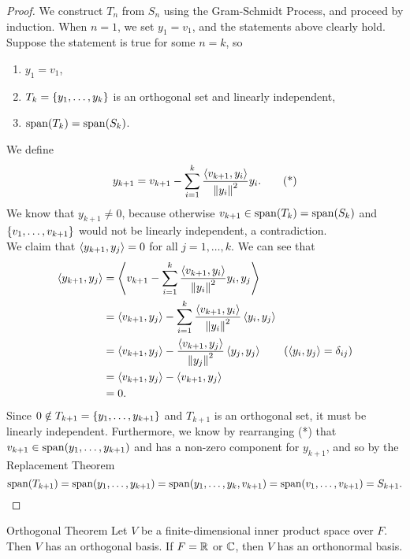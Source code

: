 \documentclass[class=article, crop=false]{standalone}
\begin{document}
  \begin{proof}
    We construct $T_n$ from $S_n$ using the Gram-Schmidt Process, and proceed by induction. When $n = 1$, we set $y_1 = v_1$, and the statements above clearly hold. Suppose the statement is true for some $n = k$, so 
    \begin{enumerate}[label=(\roman*)]
      \item $y_1 = v_1$,
      \item $T_k = \left\{y_1,\dotsc,y_k\right\}$ is an orthogonal set and linearly independent,
      \item $\operatorname{span}(T_k) = \operatorname{span}(S_k)$.
    \end{enumerate}
    We define
    \[
      y_{k+1} = v_{k+1} - \sum_{i=1}^{k}\frac{\left\langle v_{k+1},y_i \right\rangle}{\left\lVert y_i\right\rVert^2}y_i. \tag{*}
    \]
    We know that $y_{k+1}\neq 0$, because otherwise $v_{k+1}\in \operatorname{span}(T_k) = \operatorname{span}(S_k)$ and $\left\{v_1,\dotsc,v_{k+1}\right\}$ would not be linearly independent, a contradiction. \\[10pt]
    We claim that $\left\langle y_{k+1}, y_j \right\rangle = 0$ for all $j = 1,\dotsc,k$. We can see that
    \begin{align*}
      \tup{y_{k+1}, y_j} &= \tup{v_{k+1} - \sum_{i=1}^{k}\frac{\tup{v_{k+1},y_i}}{\norm{y_i}^2}y_i, y_j} \\
                         &= \tup{v_{k+1}, y_j} - \sum_{i=1}^{k}\frac{\tup{v_{k+1},y_i}}{\norm{y_i}^2}\tup{y_i,y_j} \\
                         &= \tup{v_{k+1}, y_j} - \frac{\tup{v_{k+1},y_j}}{\norm{y_j}^2}\tup{y_j, y_j} \tag{$\tup{y_i, y_j} = \delta_{ij}$}\\
                         &= \tup{v_{k+1}, y_j} - \tup{v_{k+1}, y_j} \\
                         &= 0.
    \end{align*}
    Since $0\notin T_{k+1} = \left\{y_1,\dotsc,y_{k+1}\right\}$ and $T_{k+1}$ is an orthogonal set, it must be linearly independent. Furthermore, we know by rearranging (*) that $v_{k+1}\in \operatorname{span}(y_1,\dotsc,y_{k+1})$ and has a non-zero component for $y_{k+1}$, and so by the Replacement Theorem
    \[
      \operatorname{span}(T_{k+1}) = \operatorname{span}(y_1,\dotsc,y_{k+1}) = \operatorname{span}(y_1,\dotsc,y_k,v_{k+1}) = \operatorname{span}(v_1,\dotsc,v_{k+1}) = S_{k+1}.
    \]
  \end{proof}
  \newpage
  \begin{theorem}{Orthogonal Theorem}
    Let $V$ be a finite-dimensional inner product space over $F$. Then $V$ has an orthogonal basis. If $F = \mathbb{R}$ or $\mathbb{C}$, then $V$ has an orthonormal basis.
  \end{theorem}
\end{document}
